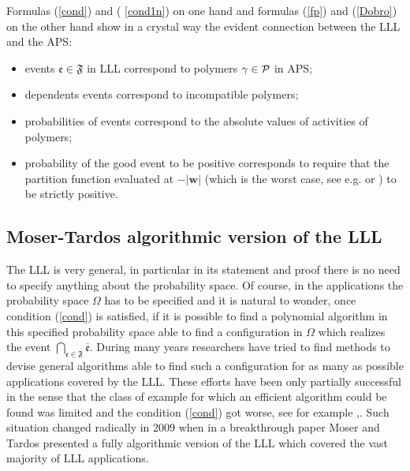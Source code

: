 \documentclass[11pt]{article}
\let\\=\noindent
\let\\=\noindent
\def\ev{{\mathfrak{e}}}
\def\PP{{\mathcal P}}\def\EE{{\mathcal E}}
\def\FF{{\mathfrak{F}}}
\def\Om{\Omega}
\begin{document}
\\Formulas (\ref{cond}) and  ( \ref{cond1n}) on one hand and formulas (\ref{fp}) and (\ref{Dobro}) on the other hand  show in a crystal way   the evident connection between the  LLL and the APS:
\begin{itemize}
\item[-] events $\ev\in \FF$ in LLL correspond to polymers $\g\in \PP$ in APS;

\item[-] dependents events  correspond to incompatible polymers;

\item[-] probabilities of events correspond to   the absolute values of activities of polymers;

\item[-] probability of the good event to be positive corresponds to require that  the partition function evaluated at  $-|\bm w|$ (which is the worst case, see e.g. \cite{SS} or \cite{BFP}) to be strictly positive.
\end{itemize}


\subsection{Moser-Tardos algorithmic version of the LLL}
\\The LLL is very general, in particular in   its   statement and  proof  there is no need to specify anything about the probability space. Of course, in the applications
the probability space $\Om$ has to be specified and it is natural to wonder, once condition (\ref{cond}) is satisfied, if it is possible to find a  polynomial algorithm  in this specified probability space  able to find a configuration in $\Om$ which
realizes the event  $\bigcap_{\ev\in \FF}\overline \ev$.
During many years researchers have tried to find  methods to devise  general  algorithms able to find such a  configuration for  as many as possible applications covered by the LLL. These efforts have been only partially successful in the sense that the class  of example for which an efficient algorithm could be found  was limited  and
 the condition (\ref{cond}) got  worse, see for example \cite{A},\cite{B}. Such situation changed radically in 2009 when in
a  breakthrough paper \cite{MT}  Moser and Tardos presented a fully algorithmic version of the LLL which covered the vast majority of LLL applications.
\end{document}
